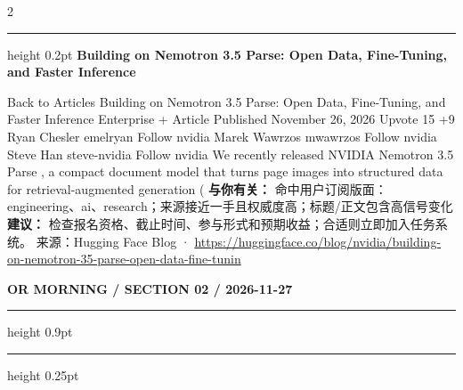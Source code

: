 \documentclass[10.5pt]{ctexart}
\begin{document}
\begin{multicols}{2}
\vspace{2mm}
\hrule height 0.2pt
\vspace{2mm}
{\large\bfseries Building on Nemotron 3.5 Parse: Open Data, Fine-Tuning, and Faster Inference}\par
Back to Articles Building on Nemotron 3.5 Parse: Open Data, Fine-Tuning, and Faster Inference Enterprise + Article Published November 26, 2026 Upvote 15 +9 Ryan Chesler emelryan Follow nvidia Marek Wawrzos mwawrzos Follow nvidia Steve Han steve-nvidia Follow nvidia We recently released NVIDIA Nemotron 3.5 Parse , a compact document model that turns page images into structured data for retrieval-augmented generation (
\textbf{与你有关：} 命中用户订阅版面：engineering、ai、research；来源接近一手且权威度高；标题/正文包含高信号变化
\textbf{建议：} 检查报名资格、截止时间、参与形式和预期收益；合适则立即加入任务系统。
{\footnotesize\color{ormuted} 来源：Hugging Face Blog · \url{https://huggingface.co/blog/nvidia/building-on-nemotron-35-parse-open-data-fine-tunin}}
\end{multicols}
\newpage
{\small\bfseries OR MORNING / SECTION 02 / 2026-11-27}
\vspace{2mm}
\hrule height 0.9pt
\vspace{1.5mm}
\hrule height 0.25pt
\vspace{4mm}
\end{document}
